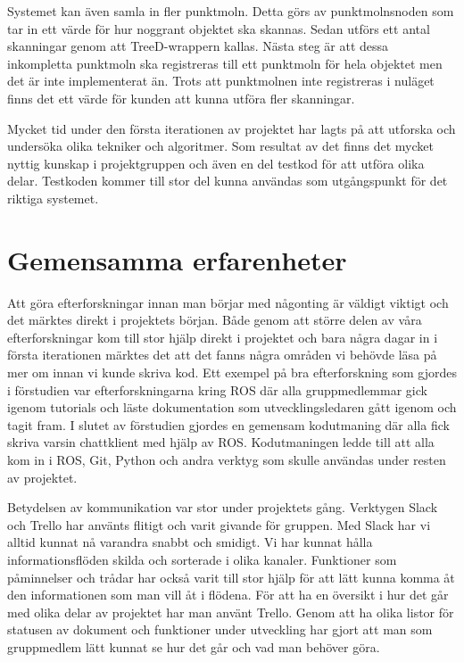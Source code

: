 Systemet kan även samla in fler punktmoln. Detta görs av punktmolnsnoden som tar in ett värde för hur noggrant objektet ska skannas. Sedan utförs ett antal skanningar genom att TreeD-wrappern kallas. Nästa steg är att dessa inkompletta punktmoln ska registreras till ett punktmoln för hela objektet men det är inte implementerat än. Trots att punktmolnen inte registreras i nuläget finns det ett värde för kunden att kunna utföra fler skanningar.

Mycket tid under den första iterationen av projektet har lagts på att utforska och undersöka olika tekniker och algoritmer. Som resultat av det finns det mycket nyttig kunskap i projektgruppen och även en del testkod för att utföra olika delar. Testkoden kommer till stor del kunna användas som utgångspunkt för det riktiga systemet.


\section{Gemensamma erfarenheter}

Att göra efterforskningar innan man börjar med någonting är väldigt viktigt och det märktes direkt i projektets början. Både genom att större delen av våra efterforskningar kom till stor hjälp direkt i projektet och bara några dagar in i första iterationen märktes det att det fanns några områden vi behövde läsa på mer om innan vi kunde skriva kod. Ett exempel på bra efterforskning som gjordes i förstudien var efterforskningarna kring ROS där alla gruppmedlemmar gick igenom tutorials och läste dokumentation som utvecklingsledaren gått igenom och tagit fram. I slutet av förstudien gjordes en gemensam kodutmaning där alla fick skriva varsin chattklient med hjälp av ROS. Kodutmaningen ledde till att alla kom in i ROS, Git, Python och andra verktyg som skulle användas under resten av projektet.

Betydelsen av kommunikation var stor under projektets gång. Verktygen Slack och Trello har använts flitigt och varit givande för gruppen. Med Slack har vi alltid kunnat nå varandra snabbt och smidigt. Vi har kunnat hålla informationsflöden skilda och sorterade i olika kanaler. Funktioner som påminnelser och trådar har också varit till stor hjälp för att lätt kunna komma åt den informationen som man vill åt i flödena. För att ha en översikt i hur det går med olika delar av projektet har man använt Trello. Genom att ha olika listor för statusen av dokument och funktioner under utveckling har gjort att man som gruppmedlem lätt kunnat se hur det går och vad man behöver göra. 

